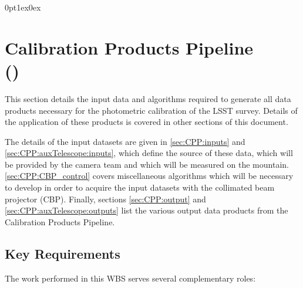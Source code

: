 \titlespacing*{\subsubsection}
{0pt}{1ex}{0ex}


\section{Calibration Products Pipeline\\(\wbsCPP)}
\label{sec:cpp}

This section details the input data and algorithms required to generate all data products necessary for the photometric calibration of the LSST survey. Details of the application of these products is covered in other sections of this document.

The details of the input datasets are given in \secsymbol\ref{sec:CPP:inputs} and \secsymbol\ref{sec:CPP:auxTelescope:inputs}, which define the source of these data, \ie which will be provided by the camera team and which will be measured on the mountain. \secsymbol\ref{sec:CPP:CBP_control} covers miscellaneous algorithms which will be necessary to develop in order to acquire the input datasets with the collimated beam projector (CBP). Finally, sections \secsymbol\ref{sec:CPP:output} and \secsymbol\ref{sec:CPP:auxTelescope:outputs} list the various output data products from the Calibration Products Pipeline.

\subsection{Key Requirements}
\label{sec:CPP:keyRequirements}
The work performed in this WBS serves several complementary roles:

